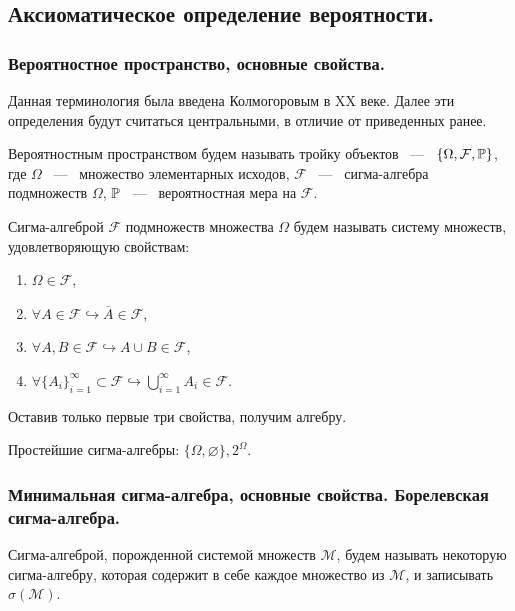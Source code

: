\subsection{Аксиоматическое определение вероятности.}
\subsubsection{Вероятностное пространство, основные свойства.}
\noindent Данная терминология была введена Колмогоровым в XX веке. Далее эти определения будут считаться центральными, в отличие от приведенных ранее. 

\begin{definition}
    Вероятностным пространством будем называть тройку объектов ~---~ $\{\Omega, \mathcal{F}, \P\}$, где $\Omega$ ~---~ множество элементарных исходов, $\mathcal{F}$ ~---~ сигма-алгебра подмножеств $\Omega$, $\P$ ~---~ вероятностная мера на $\mathcal{F}$.
\end{definition}

\begin{definition}
    Сигма-алгеброй $\mathcal{F}$ подмножеств множества $\Omega$ будем называть систему множеств, удовлетворяющую свойствам: 
    \begin{enumerate}
        \item $\Omega \in \mathcal{F}$, 
        \item $\forall A \in \mathcal{F} \hookrightarrow \overline{A} \in \mathcal{F}$, 
        \item $\forall A, B \in \mathcal{F} \hookrightarrow A \cup B \in \mathcal{F}$, 
        \item $\forall \{A_i\}_{i = 1}^{\infty} \subset \mathcal{F} \hookrightarrow \bigcup\limits_{i = 1}^{\infty} A_i \in \mathcal{F}$.
    \end{enumerate}
\end{definition}
\begin{remark}
    Оставив только первые три свойства, получим алгебру. 
\end{remark}

\noindent Простейшие сигма-алгебры: $\{\Omega, \varnothing\}, 2^{\Omega}$.

\subsubsection{Минимальная сигма-алгебра, основные свойства. Борелевская сигма-алгебра.}

\begin{definition}
    Сигма-алгеброй, порожденной системой множеств $\mathcal{M}$, будем называть некоторую сигма-алгебру, которая содержит в себе каждое множество из $\mathcal{M}$, и записывать $\sigma(\mathcal{M})$.
\end{definition}

